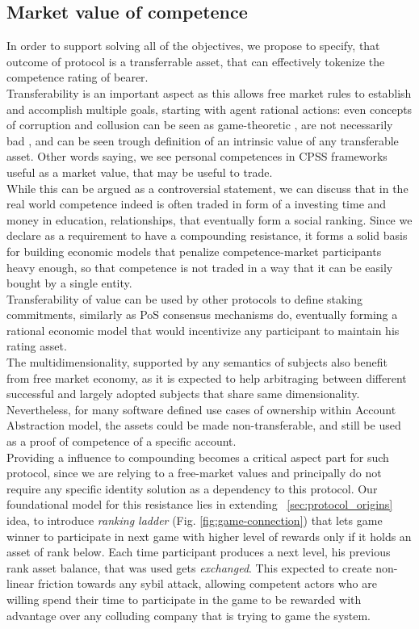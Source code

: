 \documentclass{article}
\begin{document}
\begin{CJK}{UTF8}{gbsn}
\begin{multicols}{2}
        \subsection{Market value of competence}
        In order to support solving all of the objectives, we propose to specify, that outcome of protocol is a transferrable asset, that can effectively tokenize the competence rating of bearer. \\
        Transferability is an important aspect as this allows free market rules to establish and accomplish multiple goals, starting with agent rational actions: even concepts of corruption and collusion can be seen as game-theoretic \cite{Macrae1982}, are not necessarily bad \cite{Leff1964}, and can be seen trough definition of an intrinsic value of any transferable asset. Other words saying, we see personal competences in CPSS frameworks useful as a market value, that may be useful to trade. \\While this can be argued as a controversial statement, we can discuss that in the real world competence indeed is often traded in form of a investing time and money in education, relationships, that eventually form a social ranking. Since we declare as a requirement to have a compounding resistance, it forms a solid basis for building economic models that penalize competence-market participants heavy enough,  so that competence is not traded in a way that it can be easily bought by a single entity.\\ Transferability of value can be used by other protocols to define staking commitments, similarly as PoS consensus mechanisms do, eventually forming a rational economic model that would incentivize any participant to maintain his rating asset.\\
        The multidimensionality, supported by any semantics of subjects also benefit from free market economy, as it is expected to help arbitraging between different successful and largely adopted subjects that share same dimensionality. Nevertheless, for many software defined use cases of ownership within Account Abstraction\cite{Qin2023} model, the assets could be made non-transferable, and still be used as a proof of competence of a specific account.\\
        Providing a influence to compounding becomes a critical aspect part for such protocol, since we are relying to a free-market values and principally do not require any specific identity solution as a dependency to this protocol.
        Our foundational model for this resistance lies in extending  ~\ref{sec:protocol_origins} idea, to introduce \textit{ranking ladder} (Fig. \ref*{fig:game-connection})  that lets game winner to participate in next game with higher level of rewards only if it holds an asset of rank below. Each time participant produces a next level, his previous rank asset balance, that was used gets \textit{exchanged}. This expected to create non-linear friction towards any sybil attack, allowing competent actors who are willing spend their time to participate in the game to be rewarded with advantage over any colluding company that is trying to game the system.


\end{multicols}
\end{CJK}
\end{document}
